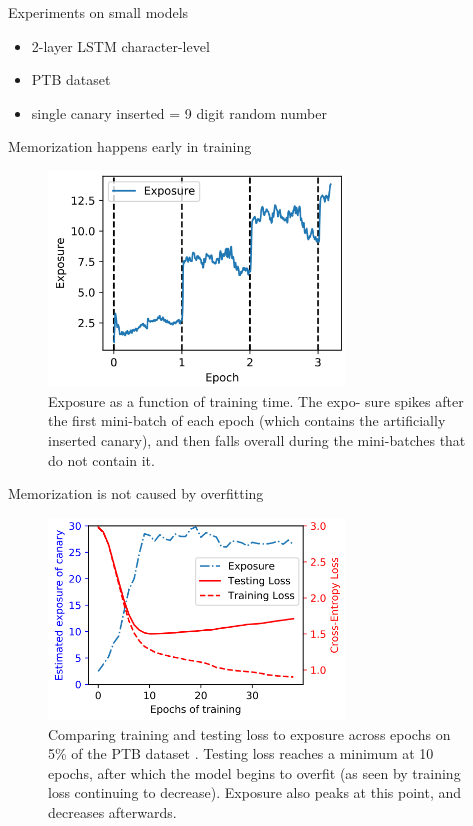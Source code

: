 \documentclass{beamer}
\begin{document}
\begin{frame}{Experiments on small models}

\begin{itemize}
\item 2-layer LSTM character-level 
\item PTB dataset 
\item single canary inserted  = 9 digit random number
\end{itemize}

\end{frame}
\begin{frame}{Memorization happens early in training}

\begin{figure}[h]
\includegraphics[width=0.7\textwidth]{img/early}
\caption{Exposure as a function of training time. The expo- sure spikes after the first mini-batch of each epoch (which contains the artificially inserted canary), and then falls overall during the mini-batches that do not contain it.}
\end{figure}

\end{frame}
\begin{frame}{Memorization is not caused by overfitting}

\begin{figure}[h]
\includegraphics[width=0.7\textwidth]{img/overfit}
\caption{Comparing training and testing loss to exposure across epochs on 5\% of the PTB dataset . Testing loss reaches a minimum at 10 epochs, after which the model begins to overfit (as seen by training loss continuing to decrease). Exposure also peaks at this point, and decreases afterwards.}
\end{figure}

\end{frame}
\end{document}
